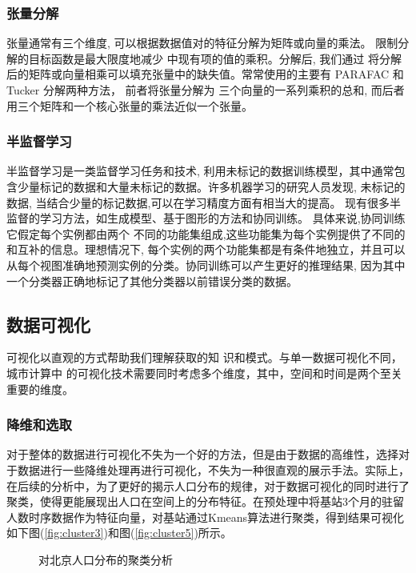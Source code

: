 \subsubsection*{张量分解}
张量通常有三个维度, 可以根据数据值对的特征分解为矩阵或向量的乘法。 限制分解的目标函数是最大限度地减少
中现有项的值的乘积。分解后, 我们通过
将分解后的矩阵或向量相乘可以填充张量中的缺失值。常常使用的主要有 PARAFAC\cite{bro1997parafac} 和 Tucker 分解\cite{kolda2009tensor}两种方法， 前者将张量分解为
三个向量的一系列乘积的总和, 而后者
用三个矩阵和一个核心张量的乘法近似一个张量。
\subsubsection*{半监督学习
}
半监督学习是一类监督学习任务和技术, 利用未标记的数据训练模型，其中通常包含少量标记的数据和大量未标记的数据。许多机器学习的研究人员发现, 未标记的数据, 当结合少量的标记数据,可以在学习精度方面有相当大的提高。 现有很多半监督的学习方法，如生成模型、基于图形的方法和协同训练。 具体来说,协同训练它假定每个实例都由两个
不同的功能集组成,这些功能集为每个实例提供了不同的和互补的信息。理想情况下, 每个实例的两个功能集都是有条件地独立，并且可以从每个视图准确地预测实例的分类。协同训练可以产生更好的推理结果, 因为其中一个分类器正确地标记了其他分类器以前错误分类的数据\cite{nigam2000analyzing}。\\

\subsection{数据可视化}
可视化以直观的方式帮助我们理解获取的知
识和模式。与单一数据可视化不同，城市计算中
的可视化技术需要同时考虑多个维度，其中，空间和时间是两个至关重要的维度\cite{zhengyu2015}。
\subsubsection*{降维和选取}
对于整体的数据进行可视化不失为一个好的方法，但是由于数据的高维性，选择对于数据进行一些降维处理再进行可视化，不失为一种很直观的展示手法。实际上，在后续的分析中，为了更好的揭示人口分布的规律，对于数据可视化的同时进行了聚类，使得更能展现出人口在空间上的分布特征。在预处理中将基站3个月的驻留人数时序数据作为特征向量，对基站通过Kmeans算法进行聚类，得到结果可视化如下图(\ref{fig:cluster3})和图(\ref{fig:cluster5})所示。
\begin{figure}[ht]
\centering
{}
\hfill
\caption{对北京人口分布的聚类分析}
\end{figure}